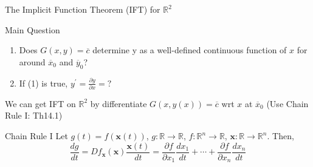 \documentclass[a4paper,11pt]{article}
\newcommand{\bb}{\mathbb}
\newcommand{\bd}{\mathbf}
\newcommand{\p}{\partial}
\begin{document}
\begin{frame}[t]{The Implicit Function Theorem (IFT) for $\bb{R}^2$}
	\begin{block}
		{Main Question}
		\begin{enumerate}
			\item Does $G(x,y)=\overline c$ determine y as a well-defined continuous function of $x$ for around $\overline x_0$ and $\overline y_0$?
			\item If (1) is true, $y^\prime = \frac{\p y}{\p x}=?$
		\end{enumerate}
	\end{block}
	We can get IFT on $\bb{R}^2$ by differentiate $G(x,y(x))=\overline c$ wrt $x$ at $\overline x_0$ (Use Chain Rule I: Th14.1)
	\begin{block}
		{Chain Rule I}
		Let $g(t)=f(\bd{x}(t))$, $g:\bb{R}\rightarrow\bb{R}$, $f:\bb{R}^n\rightarrow\bb{R}$, $\bd x :\bb{R}\rightarrow\bb{R}^n$. Then, \[
			\frac{d g}{dt} = Df_{\bd x}(\bd x) \frac {\bd x(t)}{dt} = \frac{\p f}{\p x_1}\frac{dx_1}{dt}+ \cdots +\frac{\p f}{\p x_n}\frac{dx_n}{dt}
		\]
	\end{block}
\end{frame}
\end{document}
